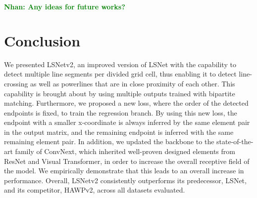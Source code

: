 \documentclass[journal]{IEEEtran}
\newcommand{\commentN}[1]{\textbf{\textcolor{green}{Nhan: #1}}}
\begin{document}






 










\commentN{Any ideas for future works?}

\section{Conclusion}
We presented LSNetv2, an improved version of LSNet with the capability to detect multiple line segments per divided grid cell, thus enabling it to detect line-crossing as well as powerlines that are in close proximity of each other.  This capability is brought about by using multiple outputs trained with bipartite matching. Furthermore, we proposed a new loss, where the order of the detected endpoints is fixed, to train the regression branch. By using this new loss, the endpoint with a smaller x-coordinate is always inferred by the same element pair in the output matrix, and the remaining endpoint is inferred with the same remaining element pair. In addition, we updated the backbone to the state-of-the-art family of ConvNext, which inherited well-proven designed elements from ResNet and Visual Transformer, in order to increase the overall receptive field of the model. We empirically demonstrate that this leads to an overall increase in performance.
Overall, LSNetv2 consistently outperforms its predecessor, LSNet, and its competitor, HAWPv2, across all datasets evaluated. %
\end{document}

